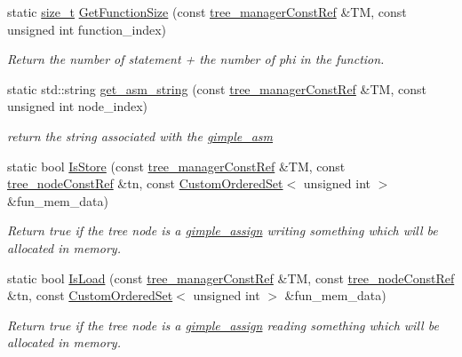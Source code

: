 \begin{DoxyCompactItemize}
static \hyperlink{tutorial__fpt__2017_2intro_2sixth_2test_8c_a7c94ea6f8948649f8d181ae55911eeaf}{size\+\_\+t} \hyperlink{classtree__helper_afc5e0c0d06c70f6194841d56879fc6e5}{Get\+Function\+Size} (const \hyperlink{tree__manager_8hpp_a792e3f1f892d7d997a8d8a4a12e39346}{tree\+\_\+manager\+Const\+Ref} \&TM, const unsigned int function\+\_\+index)
\begin{DoxyCompactList}\small\item\em Return the number of statement + the number of phi in the function. \end{DoxyCompactList}\item 
static std\+::string \hyperlink{classtree__helper_a80a46c609e5a98a19534cf3b50f5fa3e}{get\+\_\+asm\+\_\+string} (const \hyperlink{tree__manager_8hpp_a792e3f1f892d7d997a8d8a4a12e39346}{tree\+\_\+manager\+Const\+Ref} \&TM, const unsigned int node\+\_\+index)
\begin{DoxyCompactList}\small\item\em return the string associated with the \hyperlink{structgimple__asm}{gimple\+\_\+asm} \end{DoxyCompactList}\item 
static bool \hyperlink{classtree__helper_a0f38d238eda35ae3e6fb4bed5baa7ace}{Is\+Store} (const \hyperlink{tree__manager_8hpp_a792e3f1f892d7d997a8d8a4a12e39346}{tree\+\_\+manager\+Const\+Ref} \&TM, const \hyperlink{tree__node_8hpp_a3cf5d02292c940f3892425a5b5fdec3c}{tree\+\_\+node\+Const\+Ref} \&tn, const \hyperlink{classCustomOrderedSet}{Custom\+Ordered\+Set}$<$ unsigned int $>$ \&fun\+\_\+mem\+\_\+data)
\begin{DoxyCompactList}\small\item\em Return true if the tree node is a \hyperlink{structgimple__assign}{gimple\+\_\+assign} writing something which will be allocated in memory. \end{DoxyCompactList}\item 
static bool \hyperlink{classtree__helper_af59d37bb4b3cdfddc3973686f17d3deb}{Is\+Load} (const \hyperlink{tree__manager_8hpp_a792e3f1f892d7d997a8d8a4a12e39346}{tree\+\_\+manager\+Const\+Ref} \&TM, const \hyperlink{tree__node_8hpp_a3cf5d02292c940f3892425a5b5fdec3c}{tree\+\_\+node\+Const\+Ref} \&tn, const \hyperlink{classCustomOrderedSet}{Custom\+Ordered\+Set}$<$ unsigned int $>$ \&fun\+\_\+mem\+\_\+data)
\begin{DoxyCompactList}\small\item\em Return true if the tree node is a \hyperlink{structgimple__assign}{gimple\+\_\+assign} reading something which will be allocated in memory. \end{DoxyCompactList}\item 

\end{DoxyCompactItemize}
